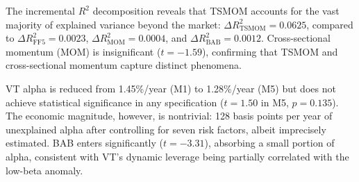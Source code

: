 The incremental $R^2$ decomposition reveals that TSMOM accounts for the vast majority of explained variance beyond the market: $\Delta R^2_{\text{TSMOM}} = 0.0625$, compared to $\Delta R^2_{\text{FF5}} = 0.0023$, $\Delta R^2_{\text{MOM}} = 0.0004$, and $\Delta R^2_{\text{BAB}} = 0.0012$. Cross-sectional momentum (MOM) is insignificant ($t = -1.59$), confirming that TSMOM and cross-sectional momentum capture distinct phenomena.

VT alpha is reduced from 1.45\%/year (M1) to 1.28\%/year (M5) but does not achieve statistical significance in any specification ($t = 1.50$ in M5, $p = 0.135$). The economic magnitude, however, is nontrivial: 128 basis points per year of unexplained alpha after controlling for seven risk factors, albeit imprecisely estimated. BAB enters significantly ($t = -3.31$), absorbing a small portion of alpha, consistent with VT's dynamic leverage being partially correlated with the low-beta anomaly.

